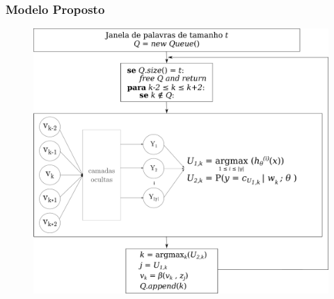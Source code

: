 \documentclass[10pt]{beamer}
\begin{document}
\begin{frame}[fragile]
\frametitle{Modelo Proposto}
\vspace{-2.5em}


  \begin{figure}
      \begin{center}
        \includegraphics[scale=0.15]{img/neuralnetworkfinal_alg2.pdf}
      \end{center}
    \end{figure}

\end{frame}
\end{document}
